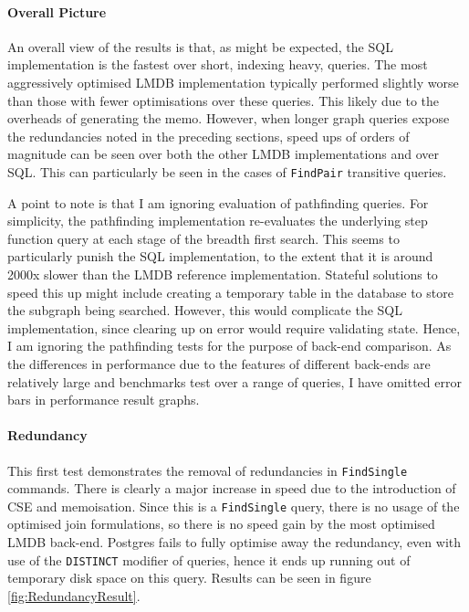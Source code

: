 \documentclass[12pt,a4paper,twoside,openright]{report}
\newcommand\codeName[1]{\texttt{#1}}
\begin{document}
		\paragraph{Overall Picture}
		An overall view of the results is that, as might be expected, the SQL implementation is the fastest over short, indexing heavy, queries. The most aggressively optimised LMDB implementation typically performed slightly worse than those with fewer optimisations over these queries. This likely due to the overheads of generating the memo. However, when longer graph queries expose the redundancies noted in the preceding sections, speed ups of orders of magnitude can be seen over both the other LMDB implementations and over SQL. This can particularly be seen in the cases of \codeName{FindPair} transitive queries.

		A point to note is that I am ignoring evaluation of pathfinding queries. For simplicity, the pathfinding implementation re-evaluates the underlying step function query at each stage of the breadth first search. This seems to particularly punish the SQL implementation, to the extent that it is around 2000x slower than the LMDB reference implementation. Stateful solutions to speed this up might include creating a temporary table in the database to store the subgraph being searched. However, this would complicate the SQL implementation, since clearing up on error would require validating state. Hence, I am ignoring the pathfinding tests for the purpose of back-end comparison.
		As the differences in performance due to the features of different back-ends are relatively large and benchmarks test over a range of queries, I have omitted error bars in performance result graphs.


\paragraph{Redundancy}
This first test demonstrates the removal of redundancies in \codeName{FindSingle} commands. There is clearly a major increase in speed due to the introduction of CSE and memoisation. Since this is a \codeName{FindSingle} query, there is no usage of the optimised join formulations, so there is no speed gain by the most optimised LMDB back-end. Postgres fails to fully optimise away the redundancy, even with use of the \texttt{DISTINCT} modifier of queries, hence it ends up running out of temporary disk space on this query. Results can be seen in figure \ref{fig:RedundancyResult}.
				
\end{document}
